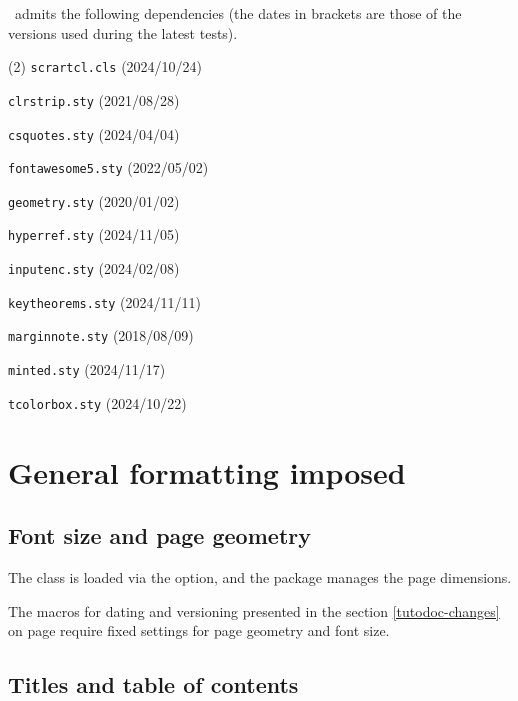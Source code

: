 \thisproj\ admits the following dependencies (the dates in brackets are those of the versions used during the latest tests).
%
\begin{tasks}[style=itemize](2)
    \task \texttt{scrartcl.cls}
    \hfill {\small (2024/10/24)}\kern10pt

    \task \texttt{clrstrip.sty}
    \hfill {\small (2021/08/28)}\kern10pt

    \task \texttt{csquotes.sty}
    \hfill {\small (2024/04/04)}\kern10pt

    \task \texttt{fontawesome5.sty}
    \hfill {\small (2022/05/02)}\kern10pt

    \task \texttt{geometry.sty}
    \hfill {\small (2020/01/02)}\kern10pt

    \task \texttt{hyperref.sty}
    \hfill {\small (2024/11/05)}\kern10pt

    \task \texttt{inputenc.sty}
    \hfill {\small (2024/02/08)}\kern10pt

    \task \texttt{keytheorems.sty}
    \hfill {\small (2024/11/11)}\kern10pt

    \task \texttt{marginnote.sty}
    \hfill {\small (2018/08/09)}\kern10pt

    \task \texttt{minted.sty}
    \hfill {\small (2024/11/17)}\kern10pt

    \task \texttt{tcolorbox.sty}
    \hfill {\small (2024/10/22)}\kern10pt
\end{tasks}


\section{General formatting imposed}

\subsection{Font size and page geometry}

The  class is loaded via the  option, and the  package manages the page dimensions.


\begin{tdocwarn}
	The macros for dating and versioning presented in the section \ref{tutodoc-changes} on page \pageref{tutodoc-changes} require fixed settings for page geometry and font size.
\end{tdocwarn}


\subsection{Titles and table of contents}

